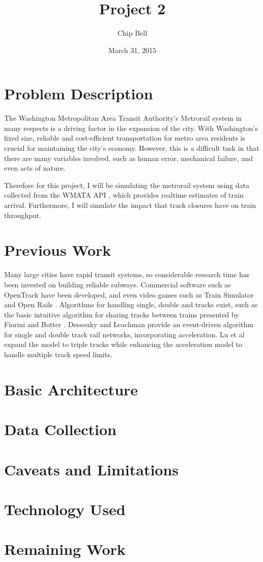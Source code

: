 \documentclass[a4paper,12pt]{article}
\begin{document}
\title{Project 2}
\author{Chip Bell}
\date{March 31, 2015}
\maketitle

\section{Problem Description}
The Washington Metropolitan Area Transit Authority's Metrorail system in many respects is a driving factor in the
expansion of the city. With Washington's fixed size, reliable and cost-efficient transportation for metro area
residents is crucial for maintaining the city's economy. However, this is a difficult task in that there are many
variables involved, such as human error, mechanical failure, and even acts of nature.

Therefore for this project, I will be simulating the metrorail system using data collected from the WMATA API
\cite{wmataapi}, which provides realtime estimates of train arrival. Furthermore, I will simulate the impact that track
closures have on train throughput.

\section{Previous Work}
Many large cities have rapid transit systems, so considerable research time has been invested on building reliable
subways. Commercial software such as OpenTrack \cite{opentrack} have been developed, and even video games such as Train
Simulator \cite{trainsimulator} and Open Rails \cite{openrails}. Algorithms for handling single, double and tracks exist, such as the basic intuitive
algorithm for sharing tracks between trains presented by Fiorini and Botter \cite{fioroni}. Dessouky and Leachman
\cite{dessouky_leachman_95} provide an event-driven algorithm for single and double track rail networks, incorporating
acceleration. Lu et al \cite{quan_lu} expand the model to triple tracks while enhancing the acceleration model to
handle multiple track speed limits.

\section{Basic Architecture}

\section{Data Collection}

\section{Caveats and Limitations}

\section{Technology Used}

\section{Remaining Work}



\end{document}

